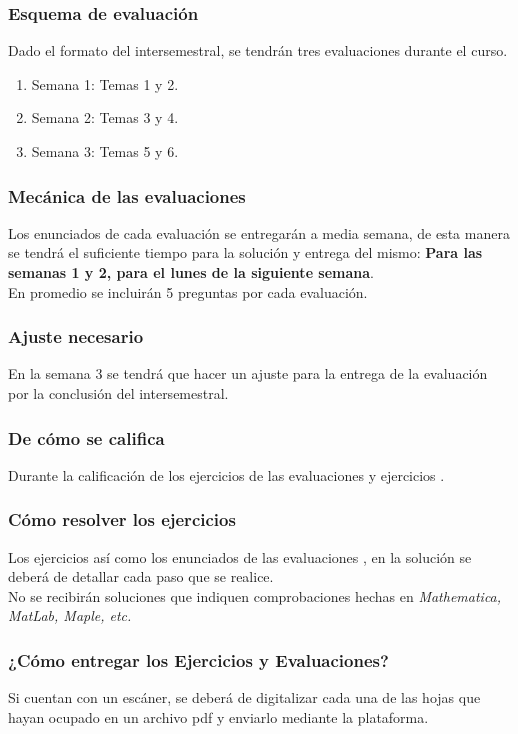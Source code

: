 \documentclass[12pt]{beamer}
\begin{document}
\begin{frame}
\frametitle{Esquema de evaluación}
Dado el formato del intersemestral, se tendrán tres evaluaciones durante el curso.
\pause
{}
\begin{enumerate}[<+->]
\item Semana 1: Temas 1 y 2.
\item Semana 2: Temas 3 y 4.
\item Semana 3: Temas 5 y 6.
\end{enumerate}
\end{frame}
\begin{frame}
\frametitle{Mecánica de las evaluaciones}
Los enunciados de cada evaluación se entregarán a media semana, de esta manera se tendrá el suficiente tiempo para la solución y entrega del mismo: \pause \textbf{Para las semanas 1 y 2, para el lunes de la siguiente semana}.
\\
\bigskip
\pause
En promedio se incluirán 5 preguntas por cada evaluación.
\end{frame}
\begin{frame}
\frametitle{Ajuste necesario}
En la semana $3$ se tendrá que hacer un ajuste para la entrega de la evaluación por la conclusión del intersemestral.
\end{frame}
\begin{frame}
\frametitle{De cómo se califica}
Durante la calificación de los ejercicios de las evaluaciones y ejercicios \pause {}.
\end{frame}
\begin{frame}
\frametitle{Cómo resolver los ejercicios}
Los ejercicios así como los enunciados de las evaluaciones , en la solución se deberá de detallar cada paso que se realice.
\\
\bigskip
\pause
No se recibirán soluciones que indiquen comprobaciones hechas en \emph{Mathematica, MatLab, Maple, etc.}
\end{frame}
\begin{frame}
\frametitle{¿Cómo entregar los Ejercicios y Evaluaciones?}
Si cuentan con un escáner, se deberá de digitalizar cada una de las hojas que hayan ocupado en un archivo pdf y enviarlo mediante la plataforma.
\end{frame}
\end{document}
